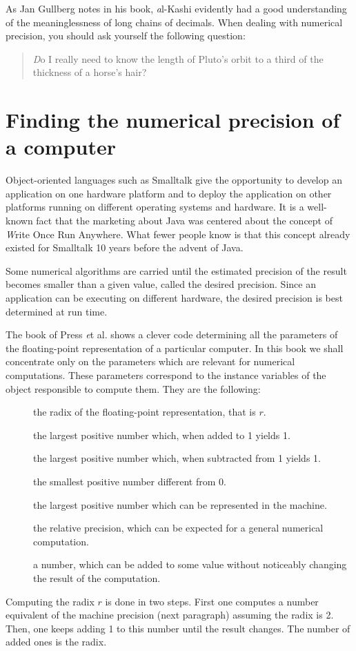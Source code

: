 As Jan Gullberg notes in his book, {\textit al-Kashi evidently had a
good understanding of the meaninglessness of long chains of
decimals}. When dealing with numerical precision, you should ask
yourself the following question:
\begin{quote}
{\textsl Do I really need to know the length of Pluto's orbit to a
third of the thickness of a horse's hair?}
\end{quote}

\section{Finding the numerical precision of a computer}
\label{sec:findprecision}
Object-oriented languages such as Smalltalk give the
opportunity to develop an application on one hardware platform and
to deploy the application on other platforms running on different
operating systems and hardware.
It is a well-known fact that the
marketing about Java was centered about the concept of {\textsl Write
Once Run Anywhere}.
What fewer people know is that this concept
already existed for Smalltalk 10 years before the advent of Java.

Some numerical algorithms are carried until the estimated
precision of the result becomes smaller than a given value, called
the desired precision. Since an application can be executing on
different hardware, the desired precision is best determined at
run time.

The book of Press {\textit et al.} \cite{Press} shows a clever code
determining all the parameters of the floating-point
representation of a particular computer. In this book we shall
concentrate only on the parameters which are relevant for
numerical computations. These parameters correspond to the
instance variables of the object responsible to compute them. They
are the following:
\begin{description}
\item[] the radix of the floating-point representation, that is $r$.
\item[] the largest positive number which, when added to 1 yields 1.
\item[] the largest positive number which, when subtracted from 1 yields 1.
\item[] the smallest positive number different from 0.
\item[] the largest positive number which can be represented in the machine.
\item[] the relative precision, which can be expected for a general numerical computation.
\item[] a number, which can be added to some value without noticeably changing the result of the computation.
\end{description}
Computing the radix $r$ is done in two steps. First one computes a
number equivalent of the machine precision (\cf next paragraph)
assuming the radix is 2. Then, one keeps adding 1 to this number
until the result changes. The number of added ones is the radix.


